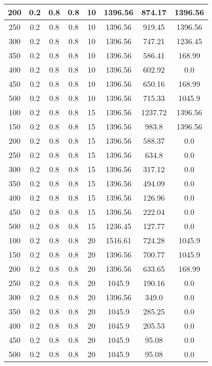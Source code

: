 \documentclass[a4paper, 12pt]{extreport}
\begin{document}
\begin{itemize}
\begin{longtable}{|c|c|c|c|c|c|c|c|}
			200 & 0.2 & 0.8 & 0.8 & 10 & 1396.56 & 874.17 & 1396.56 \\\hline
			250 & 0.2 & 0.8 & 0.8 & 10 & 1396.56 & 919.45 & 1396.56 \\\hline
			300 & 0.2 & 0.8 & 0.8 & 10 & 1396.56 & 747.21 & 1236.45 \\\hline
			350 & 0.2 & 0.8 & 0.8 & 10 & 1396.56 & 586.41 & 168.99 \\\hline
			400 & 0.2 & 0.8 & 0.8 & 10 & 1396.56 & 602.92 & 0.0 \\\hline
			450 & 0.2 & 0.8 & 0.8 & 10 & 1396.56 & 650.16 & 168.99 \\\hline
			500 & 0.2 & 0.8 & 0.8 & 10 & 1396.56 & 715.33 & 1045.9 \\\hline
			100 & 0.2 & 0.8 & 0.8 & 15 & 1396.56 & 1237.72 & 1396.56 \\\hline
			150 & 0.2 & 0.8 & 0.8 & 15 & 1396.56 & 983.8 & 1396.56 \\\hline
			200 & 0.2 & 0.8 & 0.8 & 15 & 1396.56 & 588.37 & 0.0 \\\hline
			250 & 0.2 & 0.8 & 0.8 & 15 & 1396.56 & 634.8 & 0.0 \\\hline
			300 & 0.2 & 0.8 & 0.8 & 15 & 1396.56 & 317.12 & 0.0 \\\hline
			350 & 0.2 & 0.8 & 0.8 & 15 & 1396.56 & 494.09 & 0.0 \\\hline
			400 & 0.2 & 0.8 & 0.8 & 15 & 1396.56 & 126.96 & 0.0 \\\hline
			450 & 0.2 & 0.8 & 0.8 & 15 & 1396.56 & 222.04 & 0.0 \\\hline
			500 & 0.2 & 0.8 & 0.8 & 15 & 1236.45 & 127.77 & 0.0 \\\hline
			100 & 0.2 & 0.8 & 0.8 & 20 & 1516.61 & 724.28 & 1045.9 \\\hline
			150 & 0.2 & 0.8 & 0.8 & 20 & 1396.56 & 700.77 & 1045.9 \\\hline
			200 & 0.2 & 0.8 & 0.8 & 20 & 1396.56 & 633.65 & 168.99 \\\hline
			250 & 0.2 & 0.8 & 0.8 & 20 & 1045.9 & 190.16 & 0.0 \\\hline
			300 & 0.2 & 0.8 & 0.8 & 20 & 1396.56 & 349.0 & 0.0 \\\hline
			350 & 0.2 & 0.8 & 0.8 & 20 & 1045.9 & 285.25 & 0.0 \\\hline
			400 & 0.2 & 0.8 & 0.8 & 20 & 1045.9 & 205.53 & 0.0 \\\hline
			450 & 0.2 & 0.8 & 0.8 & 20 & 1045.9 & 95.08 & 0.0 \\\hline
			500 & 0.2 & 0.8 & 0.8 & 20 & 1045.9 & 95.08 & 0.0 \\\hline

\end{longtable}
\end{itemize}
\end{document}
